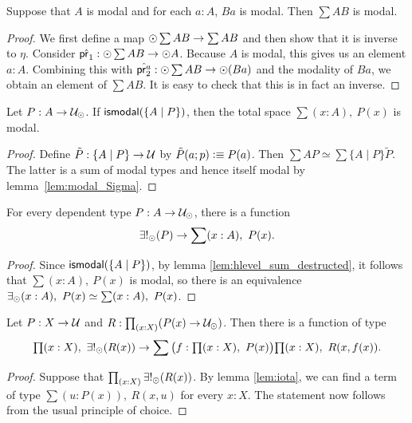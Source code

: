 \begin{lem}\label{lem:modal_Sigma}
 Suppose that $A$ is modal and for each $a:A$, $B a$ is modal. Then $\sum A B$ is modal.
\end{lem}
\begin{proof}
We first define a map $\odot \sum A B\to \sum A B$ and then show that it is inverse to $\eta$. Consider $\hat{\mathsf{pr}_{1}}:\odot \sum A B
\to \odot A$. Because $A$ is modal, this gives us an element $a:A$. Combining this with $\hat{\mathsf{pr}_{2}^a}:\odot \sum A B \to \odot (B
a)$ and the modality of $B a$, we obtain an element of $\sum A B$. It is easy to check that this is in fact an inverse.
\end{proof}

\begin{lem}\label{lem:hlevel_sum_destructed}
Let $P:A\to\mathcal{U}_{\odot}$. If $\mathsf{ismodal}(\{A\mid P\})$, then the total space $\sum(x:A),\ P(x)$ is modal. 
\end{lem}
\begin{proof}
Define $\tilde{P}:\{A\mid P\}\to \mathcal{U}$ by $\tilde{P}(a;p)\vcentcolon\equiv P(a)$.
Then $\sum A P\simeq \sum \{A\mid P\} \tilde{P}$. The latter is a sum of modal types and hence itself modal by lemma~\ref{lem:modal_Sigma}.
\end{proof}

\begin{lem}[Iota]\label{lem:iota}
For every dependent type $P:A\to\mathcal{U}_{\odot}$, there is a function
\begin{equation*}
\exists!_\modal(P)\to\sum(x:A),\ P(x).
\end{equation*}
\end{lem}

\begin{proof}
Since $\mathsf{ismodal}(\{A\mid P\})$, by lemma \ref{lem:hlevel_sum_destructed}, 
it follows that $\sum(x:A),\ P(x)$ is modal, so there is
an equivalence $\existsmodal(x:A),\ P(x)\simeq\sum(x:A),\ P(x)$.
\end{proof}

\begin{thm}
Let $P:X\to\mathcal{U}$ and $R:\prd{x:X}(P(x)\to\modaltype)$. Then there is a function of type
\begin{equation*}
\prd{x:X} \existsmodalunique(R(x))\to\sum\big(f:\prd{x:X} P(x)\big)\prd{x:X} R(x,f(x)).
\end{equation*}
\end{thm}

\begin{proof}
Suppose that $\prd{x:X} \existsmodalunique(R(x))$. By lemma \ref{lem:iota}, 
we can find a term of type $\sum(u:P(x)),\ R(x,u)$
for every $x:X$. The statement now follows from the usual principle of choice.
\end{proof}

